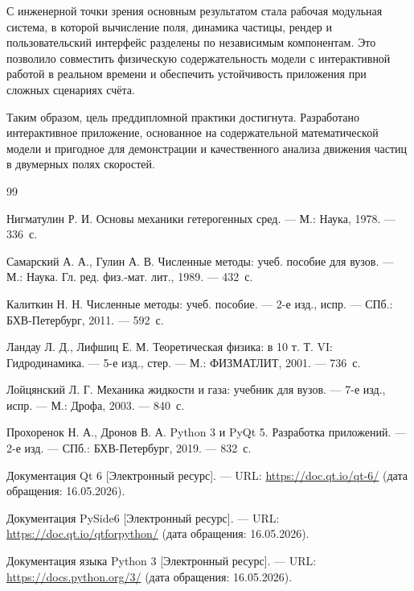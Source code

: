 \documentclass[14pt,a4paper]{extarticle}
\numberwithin{figure}{section}
\numberwithin{table}{section}
\begin{document}
С инженерной точки зрения основным результатом стала рабочая модульная система,
в которой вычисление поля, динамика частицы, рендер и пользовательский интерфейс
разделены по независимым компонентам. Это позволило совместить физическую
содержательность модели с интерактивной работой в реальном времени и обеспечить
устойчивость приложения при сложных сценариях счёта.

Таким образом, цель преддипломной практики достигнута. Разработано интерактивное
приложение, основанное на содержательной математической модели и пригодное для
демонстрации и качественного анализа движения частиц в двумерных полях скоростей.

\newpage
\begin{thebibliography}{99}

Нигматулин Р. И. Основы механики гетерогенных сред. --- М.: Наука, 1978. --- 336~с.

Самарский А. А., Гулин А. В. Численные методы: учеб. пособие для вузов. ---
М.: Наука. Гл. ред. физ.-мат. лит., 1989. --- 432~с.

Калиткин Н. Н. Численные методы: учеб. пособие. --- 2-е изд., испр. ---
СПб.: БХВ-Петербург, 2011. --- 592~с.

Ландау Л. Д., Лифшиц Е. М. Теоретическая физика: в 10 т. Т. VI:
Гидродинамика. --- 5-е изд., стер. --- М.: ФИЗМАТЛИТ, 2001. --- 736~с.

Лойцянский Л. Г. Механика жидкости и газа: учебник для вузов. --- 7-е изд.,
испр. --- М.: Дрофа, 2003. --- 840~с.

Прохоренок Н. А., Дронов В. А. Python 3 и PyQt 5. Разработка приложений. ---
2-е изд. --- СПб.: БХВ-Петербург, 2019. --- 832~с.

Документация Qt 6 [Электронный ресурс]. --- URL:
\url{https://doc.qt.io/qt-6/} (дата обращения: 16.05.2026).

Документация PySide6 [Электронный ресурс]. --- URL:
\url{https://doc.qt.io/qtforpython/} (дата обращения: 16.05.2026).

Документация языка Python 3 [Электронный ресурс]. --- URL:
\url{https://docs.python.org/3/} (дата обращения: 16.05.2026).
\end{thebibliography}
\end{document}

